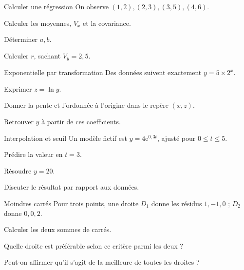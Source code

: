 \begingroup\renewcommand{\otBesoinPlace}[1]{}\begin{minipage}{\linewidth}
\begin{exercice}[2]{Calculer une régression}
On observe $(1,2),(2,3),(3,5),(4,6)$.
\begin{questions}
\item Calculer les moyennes, $V_x$ et la covariance.
\item Déterminer $a,b$.
\item Calculer $r$, sachant $V_y=2{,}5$.
\end{questions}
\end{exercice}
\begin{exercice}[2]{Exponentielle par transformation}
Des données suivent exactement $y=5\times2^x$.
\begin{questions}
\item Exprimer $z=\ln y$.
\item Donner la pente et l’ordonnée à l’origine dans le repère $(x,z)$.
\item Retrouver $y$ à partir de ces coefficients.
\end{questions}
\end{exercice}
\begin{exercice}[2]{Interpolation et seuil}
Un modèle fictif est $y=4\mathrm e^{0{,}3t}$, ajusté pour $0\leq t\leq5$.
\begin{questions}
\item Prédire la valeur en $t=3$.
\item Résoudre $y=20$.
\item Discuter le résultat par rapport aux données.
\end{questions}
\end{exercice}
\begin{exercice}[2]{Moindres carrés}
Pour trois points, une droite $D_1$ donne les résidus $1,-1,0$ ; $D_2$ donne $0,0,2$.
\begin{questions}
\item Calculer les deux sommes de carrés.
\item Quelle droite est préférable selon ce critère parmi les deux ?
\item Peut-on affirmer qu’il s’agit de la meilleure de toutes les droites ?
\end{questions}
\end{exercice}
\end{minipage}\endgroup
\clearpage
{}

